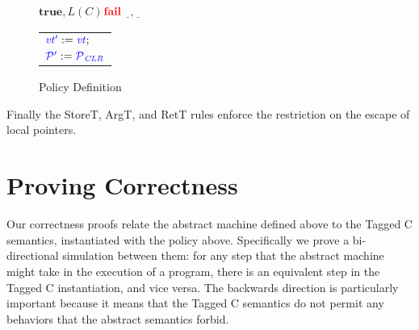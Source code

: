 \documentclass{article}
\begin{document}
\begin{figure}
\begin{minipage}{0.5\textwidth}
\end{minipage}
\begin{minipage}{0.5\textwidth}
  
             {
               {\(\mathbf{true},L(C)\)}{\(\fail\)}
               {\(\underline{~~},\underline{~~}\)}{\begin{tabular}{l}
                   \(\vt['] := \vt;\) \\
                   \(\PCT['] := \PCT[_{CLR}]\) \\
             \end{tabular}}}
\end{minipage}

\caption{Policy Definition}
\label{fig:policy}

\end{figure}

Finally the StoreT, ArgT, and RetT rules enforce the restriction on the escape of local pointers.
  
\section{Proving Correctness}

Our correctness proofs relate the abstract machine defined above to the Tagged C semantics,
instantiated with the policy above. Specifically we prove a bi-directional simulation between
them: for any step that the abstract machine might take in the execution of a program, there
is an equivalent step in the Tagged C instantiation, and vice versa. The backwards direction
is particularly important because it means that the Tagged C semantics do not permit any
behaviors that the abstract semantics forbid.
\end{document}
